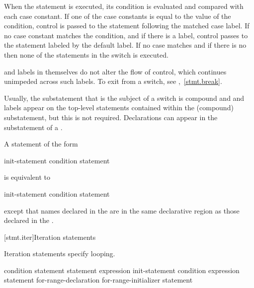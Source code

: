 \pnum
When the  statement is executed, its condition is
evaluated and compared with each case constant.
%
If one of the case constants is equal to the value of the condition,
control is passed to the statement following the matched case label. If
no case constant matches the condition, and if there is a
%
 label, control passes to the statement labeled by the
default label. If no case matches and if there is no 
then none of the statements in the switch is executed.

\pnum
{} and  labels in themselves do not alter the
flow of control, which continues unimpeded across such labels. To exit
from a switch, see ,~\ref{stmt.break}.
\begin{note}
Usually, the substatement that is the subject of a switch is compound
and  and  labels appear on the top-level
statements contained within the (compound) substatement, but this is not
required.
%
Declarations can appear in the substatement of a
.
\end{note}

\pnum
A  statement of the form

\begin{ncbnf}
 init-statement condition \terminal{)} statement
\end{ncbnf}

is equivalent to

\begin{ncbnftab}
\terminal{\{}\br
\>init-statement\br
\> condition \terminal{)} statement\br
\terminal{\}}
\end{ncbnftab}

except that names declared in the  are in
the same declarative region as those declared in the
.%

[stmt.iter]{Iteration statements}%

\pnum
Iteration statements specify looping.

%
%
%
%
\begin{bnf}
\br
     condition \terminal{)} statement\br
     statement  expression \terminal{) ;}\br
     init-statement condition\opt{} \terminal{;} expression\opt{} \terminal{)} statement\br
     for-range-declaration \terminal{:} for-range-initializer \terminal{)} statement
\end{bnf}

